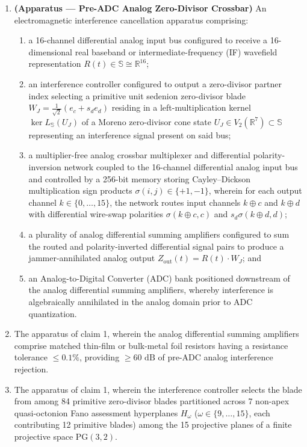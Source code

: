 \documentclass[12pt,letterpaper]{article}
\begin{document}
\begin{enumerate}[leftmargin=20pt,itemsep=4pt]
    \item \textbf{(Apparatus --- Pre-ADC Analog Zero-Divisor Crossbar)} An electromagnetic interference cancellation apparatus comprising:
    \begin{enumerate}[leftmargin=16pt,itemsep=1pt]
        \item a 16-channel differential analog input bus configured to receive a 16-dimensional real baseband or intermediate-frequency (IF) wavefield representation $R(t) \in \mathbb{S} \cong \mathbb{R}^{16}$;
        \item an interference controller configured to output a zero-divisor partner index selecting a primitive unit sedenion zero-divisor blade $W_J = \frac{1}{\sqrt{2}}(e_c + s_d e_d)$ residing in a left-multiplication kernel $\ker L_{\mathbb{S}}(U_J)$ of a Moreno zero-divisor cone state $U_J \in V_2(\mathbb{R}^7) \subset \mathbb{S}$ representing an interference signal present on said bus;
        \item a multiplier-free analog crossbar multiplexer and differential polarity-inversion network coupled to the 16-channel differential analog input bus and controlled by a 256-bit memory storing Cayley--Dickson multiplication sign products $\sigma(i, j) \in \{+1, -1\}$, wherein for each output channel $k \in \{0,\dots,15\}$, the network routes input channels $k \oplus c$ and $k \oplus d$ with differential wire-swap polarities $\sigma(k \oplus c, c)$ and $s_d \sigma(k \oplus d, d)$;
        \item a plurality of analog differential summing amplifiers configured to sum the routed and polarity-inverted differential signal pairs to produce a jammer-annihilated analog output $Z_{\mathrm{out}}(t) = R(t) \cdot W_J$; and
        \item an Analog-to-Digital Converter (ADC) bank positioned downstream of the analog differential summing amplifiers, whereby interference is algebraically annihilated in the analog domain prior to ADC quantization.
    \end{enumerate}

    \item The apparatus of claim 1, wherein the analog differential summing amplifiers comprise matched thin-film or bulk-metal foil resistors having a resistance tolerance $\le 0.1\%$, providing $\ge 60\text{ dB}$ of pre-ADC analog interference rejection.

    \item The apparatus of claim 1, wherein the interference controller selects the blade from among 84 primitive zero-divisor blades partitioned across 7 non-apex quasi-octonion Fano assessment hyperplanes $H_\omega$ ($\omega \in \{9,\dots,15\}$, each contributing 12 primitive blades) among the 15 projective planes of a finite projective space $\mathrm{PG}(3,2)$.


\end{enumerate}
\end{document}
